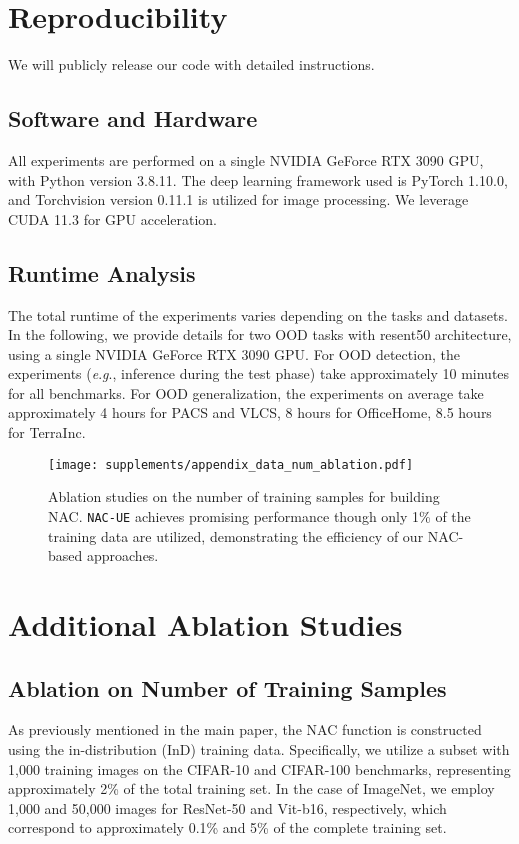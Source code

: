 \documentclass{article} \usepackage{iclr2024_conference,times}
\newcommand{\eg}{\textit{e}.\textit{g}.}
\begin{document}
\section{Reproducibility}
We will publicly release our code with detailed instructions.

\subsection{Software and Hardware}
All experiments are performed on a single NVIDIA GeForce RTX 3090 GPU, with Python version 3.8.11. The deep learning framework used is PyTorch 1.10.0, and Torchvision version 0.11.1 is utilized for image processing. We leverage CUDA 11.3 for GPU acceleration.

\subsection{Runtime Analysis}
The total runtime of the experiments varies depending on the tasks and datasets. In the following, we provide details for two OOD tasks with resent50 architecture, using a single NVIDIA GeForce RTX 3090 GPU.
For OOD detection, the experiments (\eg, inference during the test phase) take approximately 10 minutes for all benchmarks. 
For OOD generalization, the experiments on average take approximately 4 hours for PACS and VLCS, 8 hours for OfficeHome, 8.5 hours for TerraInc. 



\begin{figure*}	[t]
	\centering \texttt{[image: supplements/appendix\_data\_num\_ablation.pdf]} \caption{Ablation studies on the number of training samples for building NAC. \texttt{NAC-UE} achieves promising performance though only 1\% of the training data are utilized, demonstrating the efficiency of our NAC-based approaches.}
	\label{Appendix:Fig:OOD_tr_sample_plot}
\end{figure*}







\section{Additional Ablation Studies}





\subsection{Ablation on Number of Training Samples}
\label{Appendix:Ablation_TrainingSamples}
As previously mentioned in the main paper, the NAC function is constructed using the in-distribution (InD) training data.
Specifically, we utilize a subset with 1,000 training images on the CIFAR-10 and CIFAR-100 benchmarks, representing approximately 2\% of the total training set.
In the case of ImageNet, we employ 1,000 and 50,000 images for ResNet-50 and Vit-b16, respectively, which correspond to approximately 0.1\% and 5\% of the complete training set.
\end{document}
